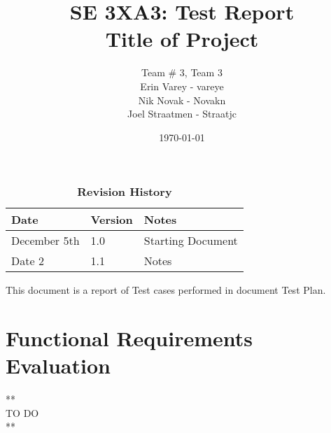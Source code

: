 \documentclass[12pt, titlepage]{article}
\title{SE 3XA3: Test Report\\Title of Project}
\author{Team \# 3, Team 3
		\\ Erin Varey - vareye
		\\ Nik Novak - Novakn
		\\ Joel Straatmen - Straatjc
}
\date{\today}
\begin{document}
\maketitle
{}
\tableofcontents
\listoftables
\listoffigures
\begin{table}[bp]
\caption{\bf Revision History}
\begin{tabularx}{\textwidth}{p{3cm}p{2cm}X}
\toprule {\bf Date} & {\bf Version} & {\bf Notes}\\
\midrule
December 5th & 1.0 & Starting Document\\
Date 2 & 1.1 & Notes\\
\bottomrule
\end{tabularx}
\end{table}
\newpage
{}
This document is a report of Test cases performed in document Test Plan.
\section{Functional Requirements Evaluation}
**\\
TO DO \\
**\\
\end{document}
